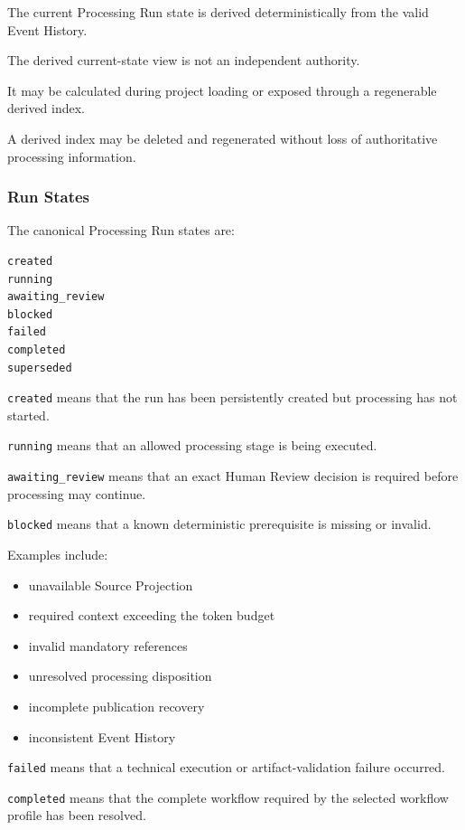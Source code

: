 The current Processing Run state is derived deterministically from the valid Event History.

The derived current-state view is not an independent authority.

It may be calculated during project loading or exposed through a regenerable derived index.

A derived index may be deleted and regenerated without loss of authoritative processing information.

\hypertarget{run-states}{%
\subsubsection{Run States}\label{run-states}}

The canonical Processing Run states are:

\begin{verbatim}
created
running
awaiting_review
blocked
failed
completed
superseded
\end{verbatim}

\texttt{created} means that the run has been persistently created but processing has not started.

\texttt{running} means that an allowed processing stage is being executed.

\texttt{awaiting\_review} means that an exact Human Review decision is required before processing may continue.

\texttt{blocked} means that a known deterministic prerequisite is missing or invalid.

Examples include:

\begin{itemize}
\tightlist
\item
  unavailable Source Projection
\item
  required context exceeding the token budget
\item
  invalid mandatory references
\item
  unresolved processing disposition
\item
  incomplete publication recovery
\item
  inconsistent Event History
\end{itemize}

\texttt{failed} means that a technical execution or artifact-validation failure occurred.

\texttt{completed} means that the complete workflow required by the selected workflow profile has been resolved.

